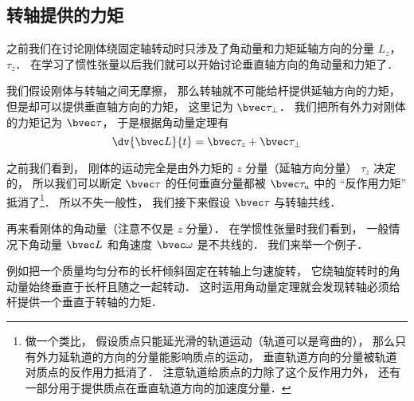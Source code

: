 
\begin{issues}
\issueDraft
\end{issues}


\subsection{转轴提供的力矩}
之前我们在讨论刚体绕固定轴转动时只涉及了角动量和力矩延轴方向的分量 $L_z$， $\tau_z$． 在学习了惯性张量以后我们就可以开始讨论垂直轴方向的角动量和力矩了．



我们假设刚体与转轴之间无摩擦， 那么转轴就不可能给杆提供延轴方向的力矩， 但是却可以提供垂直轴方向的力矩， 这里记为 $\bvec\tau_\bot$． 我们把所有外力对刚体的力矩记为 $\bvec\tau$， 于是根据角动量定理有
\begin{equation}
\dv{\bvec L}{t} = \bvec\tau_z + \bvec\tau_\bot
\end{equation}

之前我们看到， 刚体的运动完全是由外力矩的 $z$ 分量（延轴方向分量） $\tau_z$ 决定的， 所以我们可以断定 $\bvec\tau$ 的任何垂直分量都被 $\bvec\tau_a$ 中的 “反作用力矩” 抵消了\footnote{做一个类比， 假设质点只能延光滑的轨道运动（轨道可以是弯曲的）， 那么只有外力延轨道的方向的分量能影响质点的运动， 垂直轨道方向的分量被轨道对质点的反作用力抵消了． 注意轨道给质点的力除了这个反作用力外， 还有一部分用于提供质点在垂直轨道方向的加速度分量．}． 所以不失一般性， 我们接下来假设 $\bvec\tau$ 与转轴共线．

再来看刚体的角动量（注意不仅是 $z$ 分量）． 在学惯性张量时我们看到， 一般情况下角动量 $\bvec L$ 和角速度 $\bvec \omega$ 是不共线的． 我们来举一个例子．


\begin{example}{}\label{RBrot2_ex1}
例如把一个质量均匀分布的长杆倾斜固定在转轴上匀速旋转，%
它绕轴旋转时的角动量始终垂直于长杆且随之一起转动． 这时运用角动量定理就会发现转轴必须给杆提供一个垂直于转轴的力矩．
\end{example}